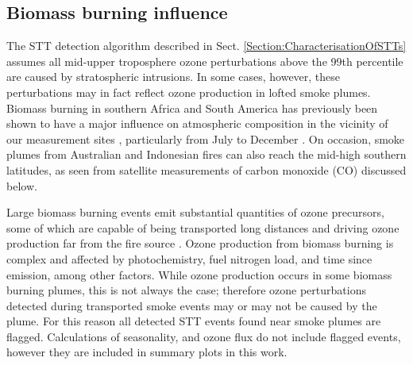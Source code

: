 \documentclass[acp, manuscript]{copernicus} %
\begin{document}
  \subsection{Biomass burning influence}
  \label{Section:BiomassBurning}
    The STT detection algorithm described in Sect. \ref{Section:CharacterisationOfSTTs} assumes all mid-upper troposphere ozone perturbations above the 99th percentile are caused by stratospheric intrusions. 
    In some cases, however, these perturbations may in fact reflect ozone production in lofted smoke plumes.
    Biomass burning in southern Africa and South America has previously been shown to have a major influence on atmospheric composition in the vicinity of our measurement sites \citep{Oltmans2001, Gloudemans2006, Edwards2006}, particularly from July to December \citep{Pak2003, Liu2016}.
    On occasion, smoke plumes from Australian and Indonesian fires can also reach the mid-high southern latitudes, as seen from satellite measurements of carbon monoxide (CO) discussed below. %

    Large biomass burning events emit substantial quantities of ozone precursors, some of which are capable of being transported long distances and driving ozone production far from the fire source \citep{Jaffe2012}.
    Ozone production from biomass burning is complex and affected by photochemistry, fuel nitrogen load, and time since emission, among other factors. 
    While ozone production occurs in some biomass burning plumes, this is not always the case; therefore ozone perturbations detected during transported smoke events may or may not be caused by the plume.
    For this reason all detected STT events found near smoke plumes are flagged.
    Calculations of seasonality, and ozone flux do not include flagged events, however they are included in summary plots in this work.

\end{document}
